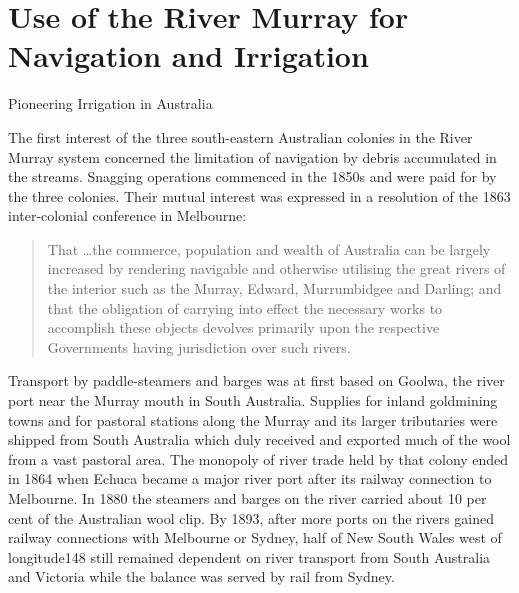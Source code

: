 
\setcounter{endnote}{0}

\chapter{Use of the River Murray for Navigation and Irrigation}
\label{ch:murray}
%
{Pioneering Irrigation in Australia}

The first interest of the three south-eastern Australian colonies in
the River Murray system concerned the limitation of navigation by
debris accumulated in the streams.  Snagging operations commenced in
the 1850s and were paid for by the three colonies.  Their mutual
interest was expressed in a resolution of the 1863 inter-colonial
conference in Melbourne:
\begin{quote}
	That \ldots the commerce, population and wealth of Australia
	can be largely increased by rendering navigable and otherwise
	utilising the great rivers of the interior such as the Murray,
	Edward, Murrumbidgee and Darling; and that the obligation of
	carrying into effect the necessary works to accomplish these
	objects devolves primarily upon the respective Governments
	having jurisdiction over such rivers.
\end{quote}

Transport by paddle-steamers and barges was at first based on Goolwa,
the river port near the Murray mouth in South Australia.  Supplies for
inland goldmining towns and for pastoral stations along the Murray and
its larger tributaries were shipped from South Australia which duly
received and exported much of the wool from a vast pastoral area.  The
monopoly of river trade held by that colony ended in 1864 when Echuca
became a major river port after its railway connection to Melbourne.
In 1880 the steamers and barges on the river carried about 10 per cent
of the Australian wool clip.  By 1893, after more ports on the rivers
gained railway connections with Melbourne or Sydney, half of New South
Wales west of longitude148 still remained dependent on river transport
from South Australia and Victoria while the balance was served by rail
from Sydney.

